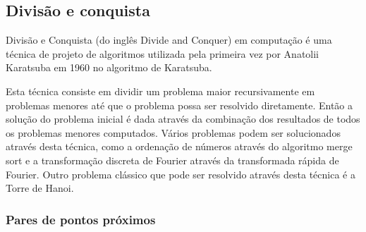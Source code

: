 \subsection{Divisão e conquista}

    Divisão e Conquista (do inglês Divide and Conquer) em computação é uma técnica 
    de projeto de algoritmos utilizada pela primeira vez por Anatolii Karatsuba em 1960
    no algoritmo de Karatsuba. 

    Esta técnica consiste em dividir um problema maior recursivamente em
    problemas menores até que o problema possa ser resolvido diretamente. Então a 
    solução do problema inicial é dada através da combinação dos resultados de todos 
    os problemas menores computados. Vários problemas podem ser solucionados através 
    desta técnica, como a ordenação de números através do algoritmo merge sort e a 
    transformação discreta de Fourier através da transformada rápida de Fourier. 
    Outro problema clássico que pode ser resolvido através desta técnica é a Torre de Hanoi. 

\subsubsection{Pares de pontos próximos}
